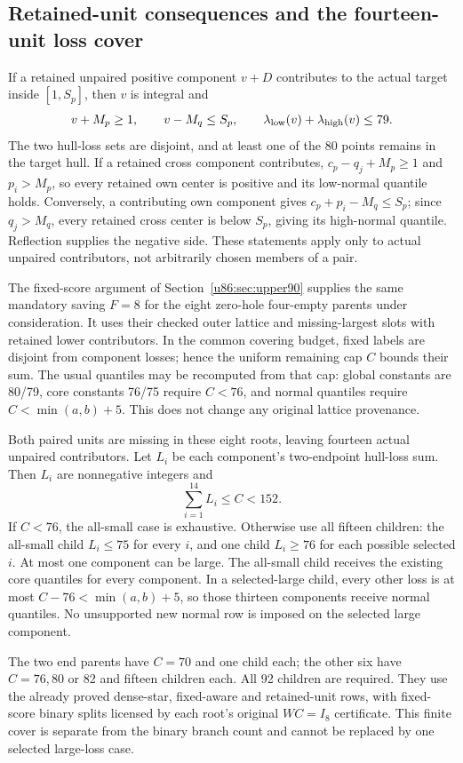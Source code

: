 \documentclass[11pt,a4paper]{article}
\theoremstyle{remark}
\begin{document}
\subsection{Retained-unit consequences and the fourteen-unit loss cover}
If a retained unpaired positive component $v+D$ contributes to the
actual target inside $[1,S_p]$, then $v$ is integral and
\[
 v+M_p\ge1,\qquad v-M_q\le S_p,\qquad
 \lambda_{\rm low}(v)+\lambda_{\rm high}(v)\le79.
\]
The two hull-loss sets are disjoint, and at least one of the 80 points
remains in the target hull. If a retained cross component contributes,
$c_p-q_j+M_p\ge1$ and $p_i>M_p$, so every retained own center is
positive and its low-normal quantile holds. Conversely, a contributing
own component gives $c_p+p_i-M_q\le S_p$; since $q_j>M_q$, every
retained cross center is below $S_p$, giving its high-normal quantile.
Reflection supplies the negative side. These statements apply only to
actual unpaired contributors, not arbitrarily chosen members of a pair.

The fixed-score argument of Section~\ref{u86:sec:upper90} supplies the same
mandatory saving $F=8$ for the eight zero-hole four-empty parents under
consideration. It uses their checked outer lattice and missing-largest
slots with retained lower contributors. In the common covering budget,
fixed labels are disjoint from component losses; hence the uniform
remaining cap $C$ bounds their sum. The usual quantiles may be recomputed
from that cap: global constants are 80/79, core constants 76/75 require
$C<76$, and normal quantiles require $C<\min(a,b)+5$.
This does not change any original lattice provenance.

Both paired units are missing in these eight roots, leaving fourteen
actual unpaired contributors. Let $L_i$ be each component's two-endpoint
hull-loss sum. Then $L_i$ are nonnegative integers and
\[
 \sum_{i=1}^{14}L_i\le C<152.
\]
If $C<76$, the all-small case is exhaustive. Otherwise use all fifteen
children: the all-small child $L_i\le75$ for every $i$, and one child
$L_i\ge76$ for each possible selected $i$.
At most one component can be large. The all-small child receives the
existing core quantiles for every component. In a selected-large child,
every other loss is at most $C-76<\min(a,b)+5$, so those thirteen
components receive normal quantiles. No unsupported new normal row is
imposed on the selected large component.

The two end parents have $C=70$ and one child each; the other six have
$C=76,80$ or 82 and fifteen children each. All 92 children are required.
They use the already proved dense-star, fixed-aware and retained-unit
rows, with fixed-score binary splits licensed by each root's original
$WC=I_8$ certificate. This finite cover is separate from the binary
branch count and cannot be replaced by one selected large-loss case.
\end{document}
